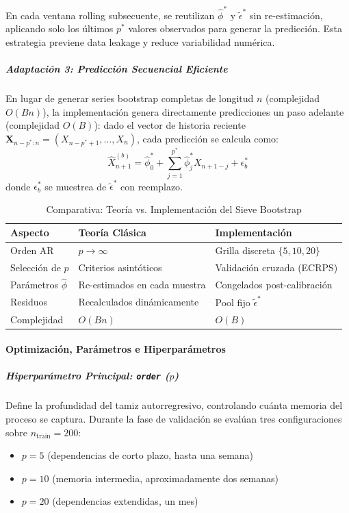 En cada ventana rolling subsecuente, se reutilizan $\hat{\phi}^*$ y $\tilde{\epsilon}^*$ sin re-estimación, aplicando solo los últimos $p^*$ valores observados para generar la predicción. Esta estrategia previene data leakage y reduce variabilidad numérica.

\subparagraph{Adaptación 3: Predicción Secuencial Eficiente}
En lugar de generar series bootstrap completas de longitud $n$ (complejidad $O(Bn)$), la implementación genera directamente predicciones un paso adelante (complejidad $O(B)$): dado el vector de historia reciente $\mathbf{X}_{n-p^*:n} = (X_{n-p^*+1}, \dots, X_n)$, cada predicción se calcula como:
\begin{equation}
\hat{X}_{n+1}^{(b)} = \hat{\phi}_0^* + \sum_{j=1}^{p^*} \hat{\phi}_j^* X_{n+1-j} + \epsilon^*_b
\end{equation}
donde $\epsilon^*_b$ se muestrea de $\tilde{\epsilon}^*$ con reemplazo.

\begin{table}[htbp]
\centering
\caption{Comparativa: Teoría vs. Implementación del Sieve Bootstrap}
\begin{tabular}{lll}
\toprule
\textbf{Aspecto} & \textbf{Teoría Clásica} & \textbf{Implementación} \\
\midrule
Orden AR & $p \to \infty$  & Grilla discreta $\{5, 10, 20\}$\\
Selección de $p$ & Criterios asintóticos & Validación cruzada (ECRPS) \\
Parámetros $\hat{\phi}$ & Re-estimados en cada muestra & Congelados post-calibración \\
Residuos & Recalculados dinámicamente & Pool fijo $\tilde{\epsilon}^*$ \\
Complejidad & $O(Bn)$ & $O(B)$ \\
\bottomrule
\end{tabular}
\end{table}


\paragraph{Optimización, Parámetros e Hiperparámetros}

\subparagraph{Hiperparámetro Principal: \texttt{order} ($p$)}
Define la profundidad del tamiz autorregresivo, controlando cuánta memoria del proceso se captura. Durante la fase de validación se evalúan tres configuraciones sobre $n_{\text{train}} = 200$:
\begin{itemize}
    \item $p = 5$ (dependencias de corto plazo, hasta una semana)
    \item $p = 10$ (memoria intermedia, aproximadamente dos semanas)
    \item $p = 20$ (dependencias extendidas, un mes)
\end{itemize}

